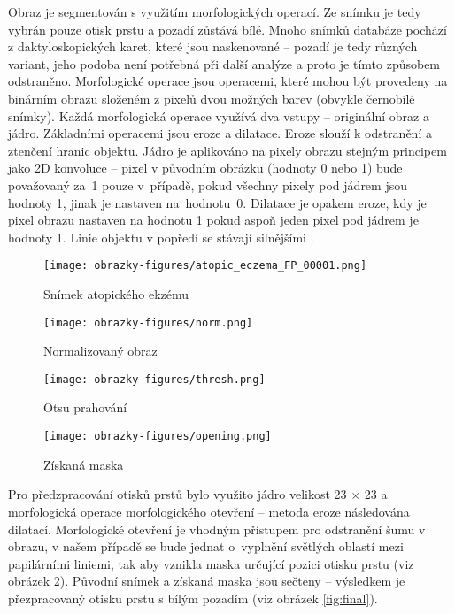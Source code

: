 Obraz je segmentován s využitím morfologických operací. Ze snímku je tedy vybrán pouze otisk prstu a pozadí zůstává bílé. Mnoho snímků databáze pochází z daktyloskopických karet, které jsou naskenované -- pozadí je tedy různých variant, jeho podoba není potřebná při další analýze a proto je tímto způsobem odstraněno. Morfologické operace jsou operacemi, které mohou být provedeny na binárním obrazu složeném z pixelů dvou možných barev (obvykle černobílé snímky). Každá morfologická operace využívá dva vstupy -- originální obraz a jádro. Základními operacemi jsou eroze a dilatace. Eroze slouží k odstranění a ztenčení hranic objektu. Jádro je aplikováno na pixely obrazu stejným principem jako 2D konvoluce -- pixel v původním obrázku (hodnoty 0 nebo 1) bude považovaný za~1 pouze v~případě, pokud všechny pixely pod jádrem jsou hodnoty 1, jinak je nastaven na~hodnotu~0. Dilatace je opakem eroze, kdy je pixel obrazu nastaven na hodnotu 1 pokud aspoň jeden pixel pod jádrem je hodnoty 1. Linie objektu v popředí se stávají silnějšími \cite{MorphologicalTransformations}. 

\begin{figure}[!htbp]
  \begin{minipage}[b]{0.5\linewidth}
    \centering
    \texttt{[image: obrazky-figures/atopic\_eczema\_FP\_00001.png]}
    \caption{Snímek atopického ekzému}
  \end{minipage}
  \hspace{0.5cm}
  \begin{minipage}[b]{0.5\linewidth}
    \centering
    \texttt{[image: obrazky-figures/norm.png]}
    \caption{Normalizovaný obraz}
    \label{fig:norm}
  \end{minipage}
\end{figure}

\begin{figure}[!htbp]
  \begin{minipage}[b]{0.5\linewidth}
    \centering
    \texttt{[image: obrazky-figures/thresh.png]}
    \caption{Otsu prahování}
     \label{fig:otsu}
  \end{minipage}
  \hspace{0.5cm}
  \begin{minipage}[b]{0.5\linewidth}
    \centering
    \texttt{[image: obrazky-figures/opening.png]}
    \caption{Získaná maska}
     \label{fig:mask}
  \end{minipage}
\end{figure}

Pro předzpracování otisků prstů bylo využito jádro velikost 23 $\times$ 23 a morfologická operace morfologického otevření -- metoda eroze následována dilatací. Morfologické otevření je vhodným přístupem pro odstranění šumu v obrazu, v našem případě se bude jednat o~vyplnění světlých oblastí mezi papilárními liniemi, tak aby vznikla maska určující pozici otisku prstu (viz obrázek \ref{fig:mask}). Původní snímek a získaná maska jsou sečteny -- výsledkem je přezpracovaný otisku prstu s bílým pozadím (viz obrázek \ref{fig:final}).

